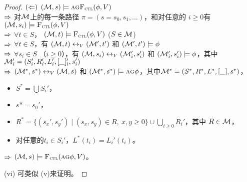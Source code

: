 \begin{proof}
	$(\Leftarrow)$ $({\cal M}, s) \models \textsc{a} \textsc{g} {\textsc{F}_{\textsc{ctl}}}(\phi, V)$\\
	$\Rightarrow$ 对${\cal M}$上的每一条路径 $\pi=(s=s_0, s_1, \dots)$，和对任意的 $i \geq 0$有 $({\cal M},s_i) \models {\textsc{F}_{\textsc{ctl}}}(\phi, V)$  \\ 
	$\Rightarrow$ $\forall t \in S$， $({\cal M},t) \models {\textsc{F}_{\textsc{ctl}}}(\phi, V)$ \quad ($S \in {\cal M}$)\\
	$\Rightarrow$ $\forall t \in S$，有 $({\cal M},t) \leftrightarrow_V ({\cal M}',t')$ 和 $({\cal M}',t') \models \phi$\\
	$\Rightarrow$ $\forall s_i \in S$ （$i \geq 0$），有  $({\cal M},s_i) \leftrightarrow_V ({\cal M}_i',s_i')$ 和 $({\cal M}_i',s_i') \models \phi$，其中${\cal M}_i' = (S_i',R_i', L_i', [\_]_i',s_i')$\\
	$\Rightarrow$ $({\cal M}^*,s^*) \leftrightarrow_V ({\cal M},s)$ 和 $({\cal M}^*,s^*) \models \textsc{a} \textsc{g} \phi$，其中${\cal M}^*= (S^*, R^*,L^*, [\_], s^*)$，
	\begin{itemize}
		\item $S^*= \bigcup S_i'$， %
		\item $s* = s_0'$，
		\item $R^* = \{(s_x', s_y') \mid (s_x, s_y) \in R,\ x, y \geq 0\} \cup \bigcup_{i \geq 0} R_i'$，其中 $R\in {\cal M}$，
		\item 对任意的$t_i\in S_i'$，$L^*(t_i) = L_i'(t_i)$。
	\end{itemize}
	$\Rightarrow$ $({\cal M},s) \models {\textsc{F}_{\textsc{ctl}}}(\textsc{a} \textsc{g} \phi, V)$。
	
	(vi) 可类似 (v)来证明。
\end{proof}
%

